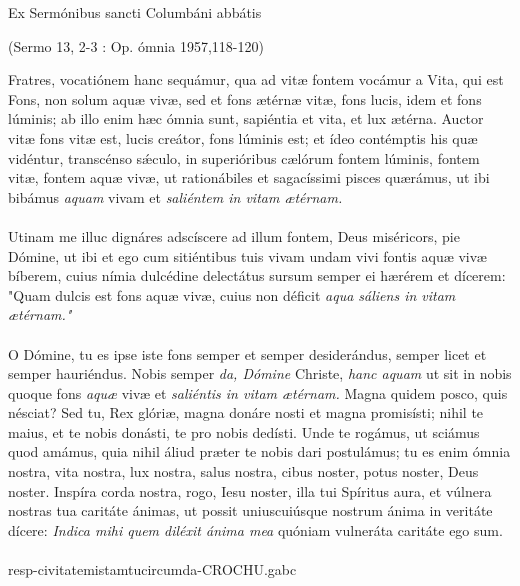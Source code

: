 \documentclass[options]{article}
\begin{document}
	Ex Sermónibus sancti Columbáni abbátis
	\begin{flushright}
	(Sermo 13, 2-3 : Op. ómnia 1957,118-120)	
	\end{flushright}
Fratres, vocatiónem hanc sequámur, qua ad vitæ fontem vocámur a Vita, qui est Fons, non solum aquæ vivæ, sed et fons ætérnæ vitæ, fons lucis, idem et fons lúminis; ab illo enim hæc ómnia sunt, sapiéntia et vita, et lux ætérna. Auctor vitæ fons vitæ est, lucis creátor, fons lúminis est; et ídeo contémptis his quæ vidéntur, transcénso s\'{æ}culo, in superióribus cælórum fontem lúminis, fontem vitæ, fontem aquæ vivæ, ut rationábiles et sagacíssimi pisces quærámus, ut ibi bibámus
\emph{aquam}
 vivam et
 \emph{saliéntem in vitam ætérnam.}\\
 \\
 Utinam me illuc dignáres adscíscere ad illum fontem, Deus miséricors, pie Dómine, ut ibi et ego cum sitiéntibus tuis vivam undam vivi fontis aquæ vivæ bíberem, cuius nímia dulcédine delectátus sursum semper ei hærérem et dícerem: "Quam dulcis est fons aquæ vivæ, cuius non déficit
 \emph{aqua sáliens in vitam ætérnam."}\\
 \\
 O Dómine, tu es ipse iste fons semper et semper desiderándus, semper licet et semper hauriéndus. Nobis semper 
 \emph{da, Dómine}
 Christe,
 \emph{hanc aquam}
 ut sit in nobis quoque fons
 \emph{aquæ}
 vivæ et
 \emph{saliéntis in vitam ætérnam.}
 Magna quidem posco, quis nésciat? Sed tu, Rex glóriæ, magna donáre nosti et magna promisísti; nihil te maius, et te nobis donásti, te pro nobis dedísti. Unde te rogámus, ut sciámus quod amámus, quia nihil áliud præter te nobis dari postulámus; tu es enim ómnia nostra, vita nostra, lux nostra, salus nostra, cibus noster, potus noster, Deus noster. Inspíra corda nostra, rogo, Iesu noster, illa tui Spíritus aura, et vúlnera nostras tua caritáte ánimas, ut possit uniuscuiúsque nostrum ánima in veritáte dícere:
  \emph{Indica mihi quem diléxit ánima mea}
  quóniam vulneráta caritáte ego sum.
 \\
 \\ 
   resp-civitatemistamtucircumda-CROCHU.gabc
\end{document}
